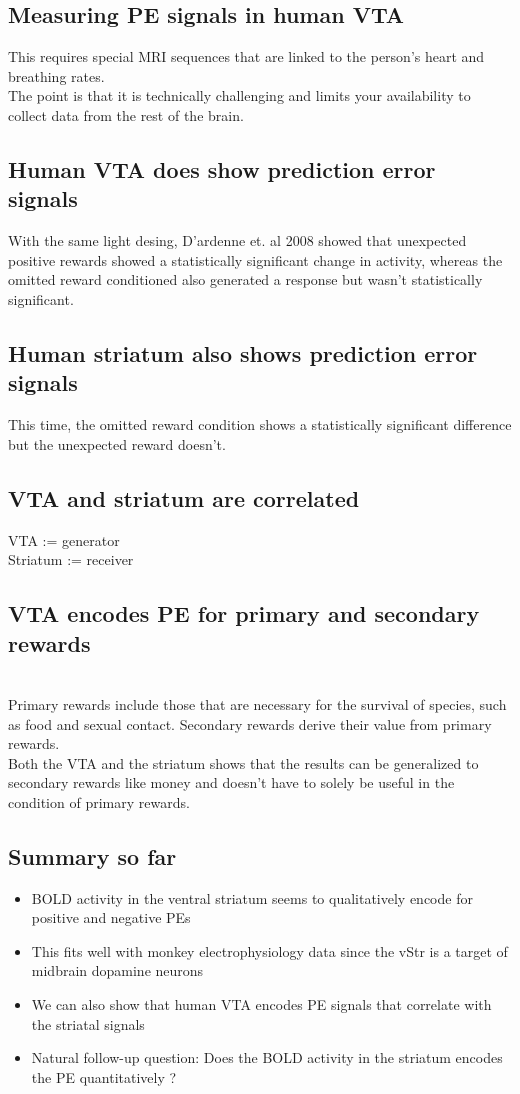 \subsection{Measuring PE signals in human VTA}
This requires special MRI sequences that are linked to the person's heart and breathing rates. 
\\The point is that it is technically challenging and limits your availability to collect data from the rest of the brain.

\subsection{Human VTA does show prediction error signals}
With the same light desing, D'ardenne et. al 2008 showed that unexpected positive rewards showed a statistically significant change in activity, whereas the omitted reward conditioned also generated a response but wasn't statistically significant.
\subsection{Human striatum also shows prediction error signals}
This time, the omitted reward condition shows a statistically significant difference but the unexpected reward doesn't.

\subsection{VTA and striatum are correlated}
VTA := generator
\\Striatum := receiver

\subsection{VTA encodes PE for primary and secondary rewards}
\\Primary rewards include those that are necessary for the survival of species, such as food and sexual contact. Secondary rewards derive their value from primary rewards. 
\\Both the VTA and the striatum shows that the results can be generalized to secondary rewards like money and doesn't have to solely be useful in the condition of primary rewards.

\subsection{Summary so far}
\begin{itemize}
    \item BOLD activity in the ventral striatum seems to qualitatively encode for positive and negative PEs
    \item This fits well with monkey electrophysiology data since the vStr is a target of midbrain dopamine neurons 
    \item We can also show that human VTA encodes PE signals that correlate with the striatal signals
    \item Natural follow-up question: Does the BOLD activity in the striatum
encodes the PE quantitatively ?
\end{itemize}


